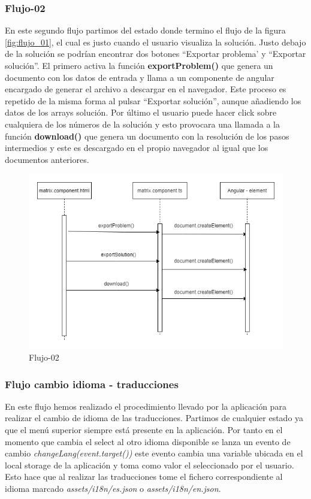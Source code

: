 \subsubsection{Flujo-02}

En este segundo flujo partimos del estado donde termino el flujo de la figura \ref{fig:flujo_01}, el cual es justo cuando el usuario visualiza la solución. Justo debajo de la solución se podrían encontrar dos botones ``Exportar problema' y ``Exportar solución''. El primero activa la función \textbf{exportProblem()} que genera un documento con los datos de entrada y llama a un componente de angular encargado de generar el archivo a descargar en el navegador. Este proceso es repetido de la misma forma al pulsar ``Exportar solución'', aunque añadiendo los datos de los arrays solución. Por último el usuario puede hacer click sobre cualquiera de los números de la solución y esto provocara una llamada a la función \textbf{download()} que genera un documento con la resolución de los pasos intermedios y este es descargado en el propio navegador al igual que los documentos anteriores.

\begin{figure}[h!] 
\centering
    \includegraphics[width=1\textwidth]{img/flujo_02.drawio.png}
\caption{Flujo-02}
\label{fig:flujo_02}
\end{figure}

\subsubsection{Flujo cambio idioma - traducciones}

En este flujo hemos realizado el procedimiento llevado por la aplicación para realizar el cambio de idioma de las traducciones. Partimos de cualquier estado ya que el menú superior siempre está presente en la aplicación. Por tanto en el momento que cambia el select al otro idioma disponible se lanza un evento de cambio \textit{changeLang(event.target())} este evento cambia una variable ubicada en el local storage de la aplicación y toma como valor el seleccionado por el usuario. Esto hace que al realizar las traducciones tome el fichero correspondiente al idioma marcado \textit{assets/i18n/es.json} o \textit{assets/i18n/en.json}. 


